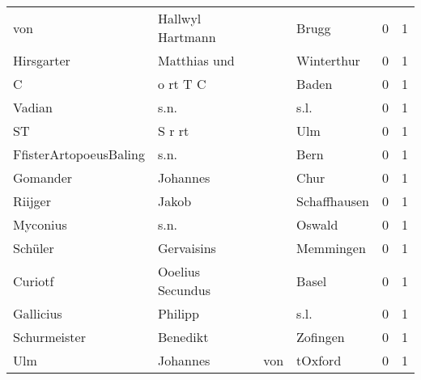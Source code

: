 \documentclass[10pt,a4paper,landscape]{article}
\begin{document}
\begin{longtable}{llllrr}
                      von &                   Hallwyl Hartmann &             &                                       Brugg &          0 &         1 \\
               Hirsgarter &                       Matthias und &             &                                  Winterthur &          0 &         1 \\
                        C &                           o rt T C &             &                                       Baden &          0 &         1 \\
                   Vadian &                               s.n. &             &                                        s.l. &          0 &         1 \\
                       ST &                             S r rt &             &                                         Ulm &          0 &         1 \\
   FfisterArtopoeusBaling &                               s.n. &             &                                        Bern &          0 &         1 \\
                 Gomander &                           Johannes &             &                                        Chur &          0 &         1 \\
                  Riijger &                              Jakob &             &                                Schaffhausen &          0 &         1 \\
                 Myconius &                               s.n. &             &                                      Oswald &          0 &         1 \\
                  Schüler &                         Gervaisins &             &                                   Memmingen &          0 &         1 \\
                  Curiotf &                   Ooelius Secundus &             &                                       Basel &          0 &         1 \\
                Gallicius &                            Philipp &             &                                        s.l. &          0 &         1 \\
             Schurmeister &                           Benedikt &             &                                    Zofingen &          0 &         1 \\
                      Ulm &                           Johannes &         von &                                     tOxford &          0 &         1 \\

\end{longtable}
\end{document}
